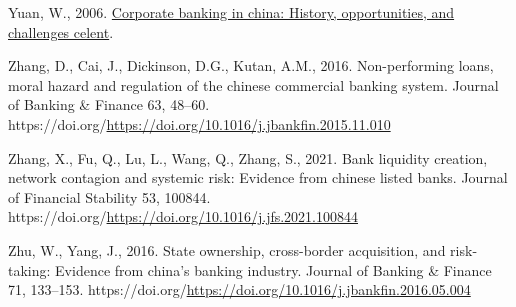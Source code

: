 \documentclass[
  12pt,
  a4paper,
  DIV=11,
  numbers=noendperiod]{scrreprt}
\newlength{\cslhangindent}
\newenvironment{CSLReferences}[2] %
 {\begin{list}{}{%
  \setlength{\itemindent}{0pt}
  \setlength{\leftmargin}{0pt}
  \setlength{\parsep}{0pt}
  \ifodd #1
   \setlength{\leftmargin}{\cslhangindent}
   \setlength{\itemindent}{-1\cslhangindent}
  \fi
  \setlength{\itemsep}{#2\baselineskip}}}
 {\end{list}}
\begin{document}
\begin{CSLReferences}{1}{0}
Yuan, W., 2006.
\href{https://www.celent.com/insights/314000619}{Corporate banking in
china: History, opportunities, and challenges \textbar{} celent}.

Zhang, D., Cai, J., Dickinson, D.G., Kutan, A.M., 2016. Non-performing
loans, moral hazard and regulation of the chinese commercial banking
system. Journal of Banking \& Finance 63, 48--60.
https://doi.org/\url{https://doi.org/10.1016/j.jbankfin.2015.11.010}

Zhang, X., Fu, Q., Lu, L., Wang, Q., Zhang, S., 2021. Bank liquidity
creation, network contagion and systemic risk: Evidence from chinese
listed banks. Journal of Financial Stability 53, 100844.
https://doi.org/\url{https://doi.org/10.1016/j.jfs.2021.100844}

Zhu, W., Yang, J., 2016. State ownership, cross-border acquisition, and
risk-taking: Evidence from china's banking industry. Journal of Banking
\& Finance 71, 133--153.
https://doi.org/\url{https://doi.org/10.1016/j.jbankfin.2016.05.004}

\end{CSLReferences}
\end{document}
